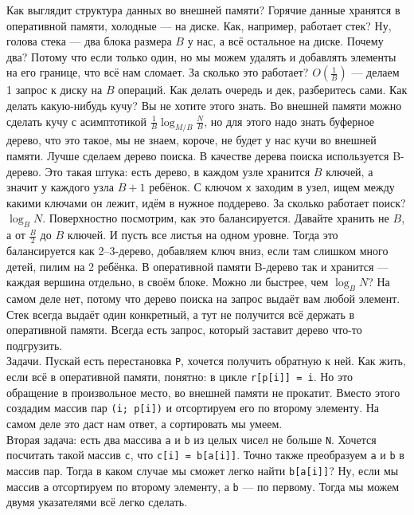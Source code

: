 \documentclass{article}
\newcommand{\pseudo}{PseudoLexer.py:PseudoLexer -x}
\newcommand{\pseudocode}[1]{\texttt{#1}}
\begin{document}
    Как выглядит структура данных во внешней памяти? Горячие данные хранятся в оперативной памяти, холодные --- на диске. Как, например, работает стек? Ну, голова стека --- два блока размера $B$ у нас, а всё остальное на диске. Почему два? Потому что если только один, но мы можем удалять и добавлять элементы на его границе, что всё нам сломает. За сколько это работает? $O\left(\frac1B\right)$ --- делаем 1 запрос к диску на $B$ операций. Как делать очередь и дек, разберитесь сами. Как делать какую-нибудь кучу? Вы не хотите этого знать. Во внешней памяти можно сделать кучу с асимптотикой $\frac1B\log_{M/B}\frac NB$, но для этого надо знать буферное дерево, что это такое, мы не знаем, короче, не будет у нас кучи во внешней памяти. Лучше сделаем дерево поиска. В качестве дерева поиска используется B-дерево. Это такая штука: есть дерево, в каждом узле хранится $B$ ключей, а значит у каждого узла $B+1$ ребёнок. С ключом \pseudocode{x} заходим в узел, ищем между какими ключами он лежит, идём в нужное поддерево. За сколько работает поиск? $\log_BN$. Поверхностно посмотрим, как это балансируется. Давайте хранить не $B$, а от $\frac B2$ до $B$ ключей. И пусть все листья на одном уровне. Тогда это балансируется как 2--3-дерево, добавляем ключ вниз, если там слишком много детей, пилим на 2 ребёнка. В оперативной памяти B-дерево так и хранится --- каждая вершина отдельно, в своём блоке. Можно ли быстрее, чем $\log_BN$? На самом деле нет, потому что дерево поиска на запрос выдаёт вам любой элемент. Стек всегда выдаёт один конкретный, а тут не получится всё держать в оперативной памяти. Всегда есть запрос, который заставит дерево что-то подгрузить.\\
    Задачи. Пускай есть перестановка \pseudocode{P}, хочется получить обратную к ней. Как жить, если всё в оперативной памяти, понятно: в цикле \pseudocode{r[p[i]] = i}. Но это обращение в произвольное место, во внешней памяти не прокатит. Вместо этого создадим массив пар \pseudocode{(i; p[i])} и отсортируем его по второму элементу. На самом деле это даст нам ответ, а сортировать мы умеем.\\
    Вторая задача: есть два массива \pseudocode{a} и \pseudocode{b} из целых чисел не больше \pseudocode{N}. Хочется посчитать такой массив \pseudocode{c}, что \pseudocode{c[i] = b[a[i]]}. Точно также преобразуем \pseudocode{a} и \pseudocode{b} в массив пар. Тогда в каком случае мы сможет легко найти \pseudocode{b[a[i]]}? Ну, если мы массив \pseudocode{a} отсортируем по второму элементу, а \pseudocode{b} --- по первому. Тогда мы можем двумя указателями всё легко сделать.\\
\end{document}
